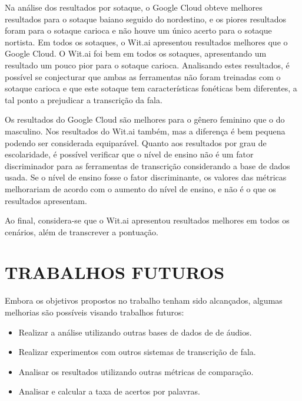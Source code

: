 Na análise dos resultados por sotaque, o Google Cloud obteve melhores resultados para o sotaque baiano seguido do nordestino, e os  piores resultados foram para o sotaque carioca e não houve um único acerto para o sotaque nortista. Em todos os sotaques, o Wit.ai apresentou resultados melhores que o Google Cloud. O Wit.ai foi bem em todos os sotaques, apresentando um resultado um pouco pior para o sotaque carioca. 
Analisando estes resultados, é possível se conjecturar que ambas as ferramentas não foram treinadas com o sotaque carioca e que este sotaque tem características fonéticas bem diferentes, a tal ponto a prejudicar a transcrição da fala. 

Os resultados do Google Cloud são melhores para o gênero feminino que o do masculino. Nos resultados do  Wit.ai também, mas a diferença é bem pequena podendo ser  considerada equiparável. Quanto aos resultados por grau de escolaridade, é possível verificar que o nível de ensino não é um fator discriminador para as ferramentas de transcrição considerando a base de dados usada. Se o nível de ensino fosse o fator discriminante, os valores das métricas melhorariam de acordo com o aumento do nível de ensino, e não é o que os resultados apresentam. 

Ao final, considera-se que o Wit.ai apresentou resultados melhores em todos os cenários, além de transcrever  a pontuação.


\section{TRABALHOS FUTUROS}

Embora os objetivos propostos no trabalho tenham sido alcançados, algumas melhorias são possíveis visando trabalhos futuros:

\begin{itemize}
    \item Realizar a análise utilizando outras bases de dados de de áudios.
    \item Realizar experimentos com outros sistemas de transcrição de fala.
    \item Analisar os resultados utilizando outras métricas de comparação.
    \item Analisar e calcular a taxa de acertos por palavras. 
    
\end{itemize}